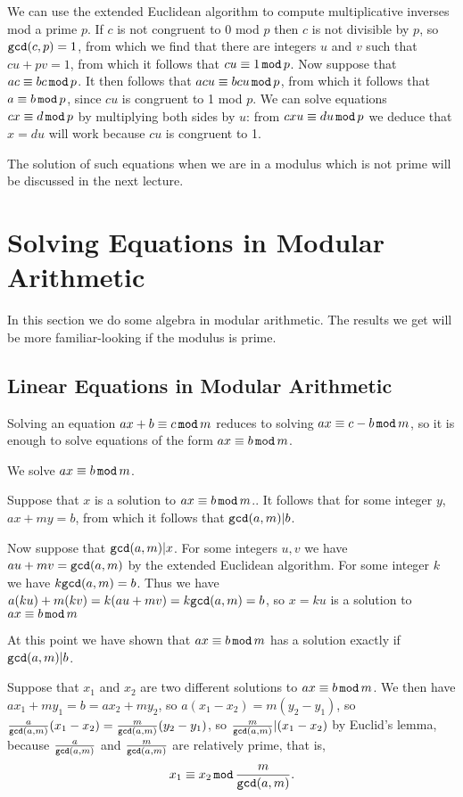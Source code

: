 \documentclass[12pt]{article}
\begin{document}
We can use the extended Euclidean algorithm to compute multiplicative inverses mod a prime $p$.
If $c$ is not congruent to 0 mod $p$ then $c$ is not divisible by $p$, so ${\tt gcd}(c,p)=1$, from which 
we find that there are integers $u$ and $v$ such that $cu+pv=1$, from which it follows that $cu \equiv 1\,{\tt mod}\, p$.  Now suppose that $ac\equiv bc\,{\tt mod}\,p$.  It then follows that $acu\equiv bcu\,{\tt mod}\,p$, from
which it follows that $a\equiv b\,{\tt mod}\,p$, since $cu$ is congruent to 1 mod $p$.  We can solve equations
$cx \equiv d \,{\tt mod}\,p$ by multiplying both sides by $u$:  from $cxu \equiv du \,{\tt mod}\,p$ we deduce that $x=du$ will work because $cu$ is congruent to 1.

The solution of such equations when we are in a modulus which is not prime will be discussed in the next lecture.

\section{Solving Equations in Modular Arithmetic}

In this section we do some algebra in modular arithmetic.  The results we get will be more familiar-looking if the modulus is prime.

\subsection{Linear Equations in Modular Arithmetic}

Solving an equation $ax + b \equiv c\,{\tt mod}\,m$ reduces to solving $ax \equiv c-b\,{\tt mod}\,m$, so it is enough to solve equations of the form $ax \equiv b\,{\tt mod}\,m$.

We solve $ax \equiv b\,{\tt mod}\,m$. 

Suppose that $x$ is a solution to $ax \equiv b\,{\tt mod}\,m$..  It follows that for some integer $y$, $ax+my = b$, from which it follows that ${\tt gcd}(a,m)|b$.

Now suppose that ${\tt gcd}(a,m)|x$.  For some integers $u,v$ we have $au+mv = {\tt gcd}(a,m)$ by the extended Euclidean algorithm.  For some integer $k$ we have $k{\tt gcd}(a,m)=b$.
Thus we have $a(ku)+m(kv) = k(au+mv) = k{\tt gcd}(a,m)=  b$, so $x=ku$ is a solution to $ax \equiv b\,{\tt mod}\,m$

At this point we have shown that $ax \equiv b\,{\tt mod}\,m$ has a solution exactly if ${\tt gcd}(a,m)|b$.

Suppose that $x_1$ and $x_2$ are two different solutions to  $ax \equiv b\,{\tt mod}\,m$.  We then have $ax_1+my_1=b=ax_2+my_2$, so $a(x_1-x_2) = m(y_2-y_1)$, so $\frac a{{\tt gcd}(a,m)}(x_1-x_2) = \frac m{{\tt gcd}(a,m)}(y_2-y_1)$, so $\frac m{{\tt gcd}(a,m)}|(x_1-x_2)$ by Euclid's lemma, because $\frac a{{\tt gcd}(a,m)}$ and $\frac m{{\tt gcd}(a,m)}$ are relatively prime, that is, $$x_1\equiv x_2\, {\tt mod}\, \frac m{{\tt gcd}(a,m)}.$$
\end{document}
